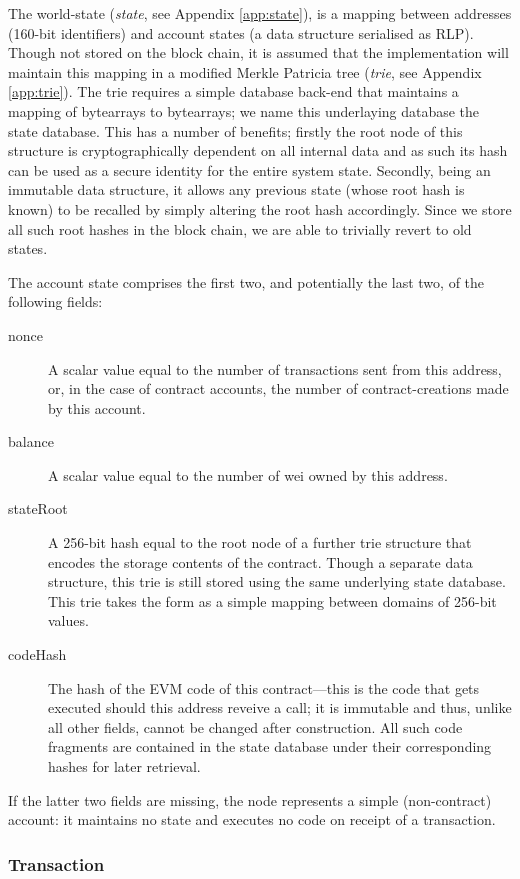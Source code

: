 \documentclass[9pt,oneside]{amsart}
\begin{document}
\begin{multicols}{2}
The world-state (\textit{state}, see Appendix \ref{app:state}), is a mapping between addresses (160-bit identifiers) and account states (a data structure serialised as RLP). Though not stored on the block chain, it is assumed that the implementation will maintain this mapping in a modified Merkle Patricia tree (\textit{trie}, see Appendix \ref{app:trie}). The trie requires a simple database back-end that maintains a mapping of bytearrays to bytearrays; we name this underlaying database the state database. This has a number of benefits; firstly the root node of this structure is cryptographically dependent on all internal data and as such its hash can be used as a secure identity for the entire system state. Secondly, being an immutable data structure, it allows any previous state (whose root hash is known) to be recalled by simply altering the root hash accordingly. Since we store all such root hashes in the block chain, we are able to trivially revert to old states.

The account state comprises the first two, and potentially the last two, of the following fields:

\begin{description}
\item[nonce] A scalar value equal to the number of transactions sent from this address, or, in the case of contract accounts, the number of contract-creations made by this account.
\item[balance] A scalar value equal to the number of wei owned by this address.
\item[stateRoot] A 256-bit hash equal to the root node of a further trie structure that encodes the storage contents of the contract. Though a separate data structure, this trie is still stored using the same underlying state database. This trie takes the form as a simple mapping between domains of 256-bit values.
\item[codeHash] The hash of the EVM code of this contract---this is the code that gets executed should this address reveive a call; it is immutable and thus, unlike all other fields, cannot be changed after construction. All such code fragments are contained in the state database under their corresponding hashes for later retrieval.
\end{description}

If the latter two fields are missing, the node represents a simple (non-contract) account: it maintains no state and executes no code on receipt of a transaction.

\subsubsection{Transaction} \label{ch:transaction}


\end{multicols}
\end{document}
